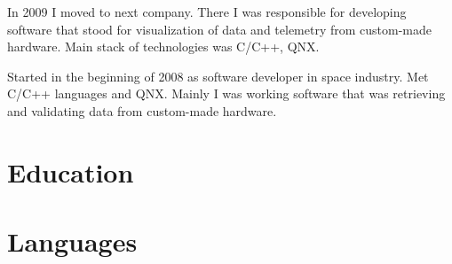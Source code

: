 \documentclass[11pt, a4paper]{moderncv}
\begin{document}
{
In 2009 I moved to next company. There I was responsible for developing software that stood for visualization of data and telemetry from custom-made hardware. Main stack of technologies was C/C++, QNX.
}

{
Started in the beginning of 2008 as software developer in space industry. 
Met C/C++ languages and QNX. 
Mainly I was working software that was retrieving and validating data from custom-made hardware.
}

\section{Education}

 
\section{Languages}
 
\end{document}
